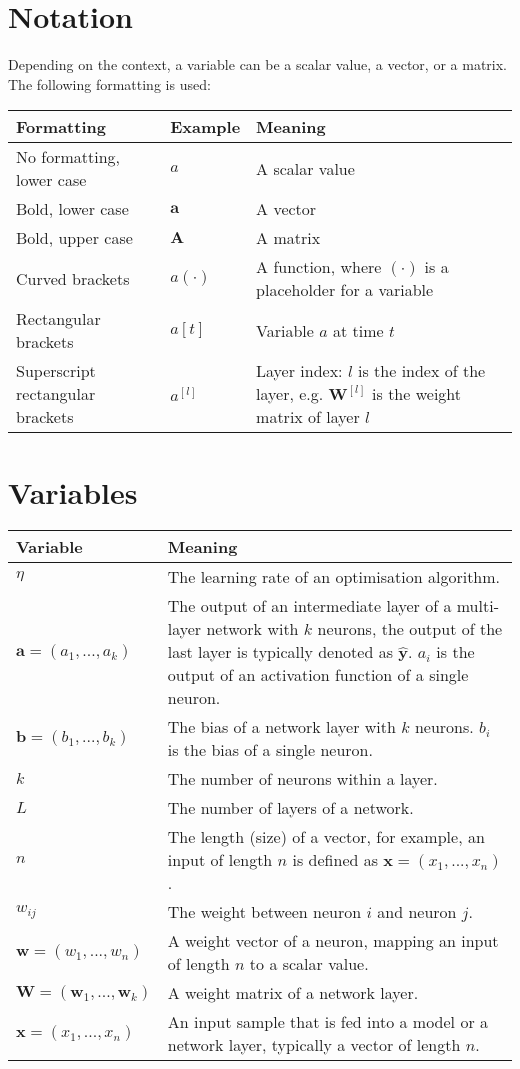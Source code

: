 \section{Notation}

Depending on the context, a variable can be a scalar value, a vector, or a matrix. The following formatting is used:

\renewcommand{\arraystretch}{1.3}
\begin{tabular}{ p{5cm} p{2cm} p{7cm} }
	\textbf{Formatting} & \textbf{Example} & \textbf{Meaning}\\
	\hline
  	No formatting, lower case & $a$ & A scalar value\\
  	Bold, lower case & $\boldsymbol{a}$ & A vector\\
  	Bold, upper case & $\boldsymbol{A}$ & A matrix\\
  	Curved brackets & $a(\cdot)$ & A function, where $(\cdot)$ is a placeholder for a variable\\
  	Rectangular brackets & $a[t]$ & Variable $a$ at time $t$\\
   Superscript rectangular brackets & $a^{[l]}$ & Layer index: $l$ is the index of the layer, e.g. $\boldsymbol{W}^{[l]}$ is the weight matrix of layer $l$\\
\end{tabular}

\section{Variables}

\begin{tabular}{ p{3cm} p{11cm} }
	\textbf{Variable} & \textbf{Meaning}\\
	\hline
	$\eta$ & The learning rate of an optimisation algorithm.\\
	$\boldsymbol{a} = (a_1, ..., a_k)$ & The output of an intermediate layer of a multi-layer network with $k$ neurons, the output of the last layer is typically denoted as $\boldsymbol{\hat{y}}$. $a_i$ is the output of an activation function of a single neuron.\\
	$\boldsymbol{b} = (b_1, ..., b_k)$ & The bias of a network layer with $k$ neurons. $b_i$ is the bias of a single neuron.\\
    $k$ & The number of neurons within a layer.\\
    $L$ & The number of layers of a network.\\
    $n$ & The length (size) of a vector, for example, an input of length $n$ is defined as $\boldsymbol{x} = (x_1, ..., x_n)$.\\
    $w_{ij}$ & The weight between neuron $i$ and neuron $j$.\\
	$\boldsymbol{w} = (w_1, ..., w_n)$ & A weight vector of a neuron, mapping an input of length $n$ to a scalar value.\\
	$\boldsymbol{W} = (\boldsymbol{w}_1, ..., \boldsymbol{w}_k)$ & A weight matrix of a network layer.\\
    $\boldsymbol{x} = (x_1, ..., x_n)$ & An input sample that is fed into a model or a network layer, typically a vector of length $n$.\\
 \end{tabular}
 
